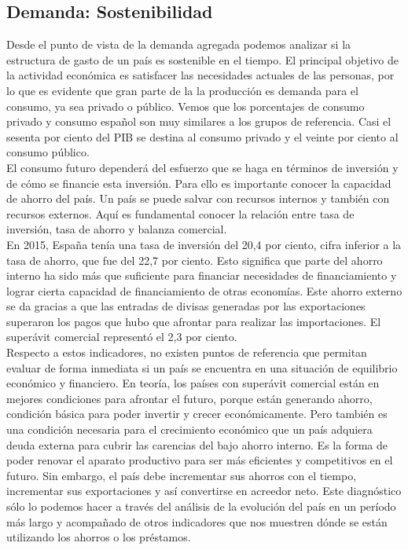     \subsection{Demanda: Sostenibilidad}
    Desde el punto de vista de la demanda agregada podemos analizar si la estructura de gasto de un país es sostenible en el tiempo. El principal objetivo de la actividad económica es satisfacer las necesidades actuales de las personas, por lo que es evidente que gran parte de la la producción es demanda para el consumo, ya sea privado o público. Vemos que los porcentajes de consumo privado y consumo español son muy similares a los grupos de referencia. Casi el sesenta por ciento del PIB se destina al consumo privado y el veinte por ciento al consumo público.\\
    El consumo futuro dependerá del esfuerzo que se haga en términos de inversión y de cómo se financie esta inversión. Para ello es importante conocer la capacidad de ahorro del país. Un país se puede salvar con recursos internos y también con recursos externos. Aquí es fundamental conocer la relación entre tasa de inversión, tasa de ahorro y balanza comercial.\\
    En 2015, España tenía una tasa de inversión del 20,4 por ciento, cifra inferior a la tasa de ahorro, que fue del 22,7 por ciento. Esto significa que parte del ahorro interno ha sido más que suficiente para financiar necesidades de financiamiento y lograr cierta capacidad de financiamiento de otras economías. Este ahorro externo se da gracias a que las entradas de divisas generadas por las exportaciones superaron los pagos que hubo que afrontar para realizar las importaciones. El superávit comercial representó el 2,3 por ciento.\\
    Respecto a estos indicadores, no existen puntos de referencia que permitan evaluar de forma inmediata si un país se encuentra en una situación de equilibrio económico y financiero. En teoría, los países con superávit comercial están en mejores condiciones para afrontar el futuro, porque están generando ahorro, condición básica para poder invertir y crecer económicamente. Pero también es una condición necesaria para el crecimiento económico que un país adquiera deuda externa para cubrir las carencias del bajo ahorro interno. Es la forma de poder renovar el aparato productivo para ser más eficientes y competitivos en el futuro. Sin embargo, el país debe incrementar sus ahorros con el tiempo, incrementar sus exportaciones y así convertirse en acreedor neto. Este diagnóstico sólo lo podemos hacer a través del análisis de la evolución del país en un período más largo y acompañado de otros indicadores que nos muestren dónde se están utilizando los ahorros o los préstamos.\\
